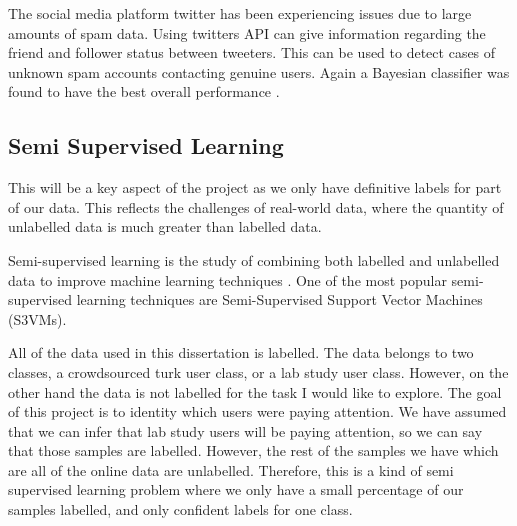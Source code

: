 \documentclass{article}
\begin{document}
The social media platform twitter has been experiencing issues due to large amounts of spam data.
Using twitters API can give information regarding the friend and follower status between tweeters.
This can be used to detect cases of unknown spam accounts contacting genuine users.
Again a Bayesian classifier was found to have the best overall performance \cite{wang2010don}.   




\subsection{Semi Supervised Learning}
This will be a key aspect of the project as we only have definitive labels for part of our data.
This reflects the challenges of real-world data, where the quantity of unlabelled data is much greater than labelled data.

Semi-supervised learning is the study of combining both labelled and unlabelled data to improve machine learning techniques \cite{zhu2009introduction}.
One of the most popular semi-supervised learning techniques are Semi-Supervised Support Vector Machines (S3VMs).




All of the data used in this dissertation is labelled.
The data belongs to two classes, a crowdsourced turk user class, or a lab study user class.
However, on the other hand the data is not labelled for the task I would like to explore.
The goal of this project is to identity which users were paying attention.
We have assumed that we can infer that lab study users will be paying attention, so we can say that those samples are labelled.
However, the rest of the samples we have which are all of the online data are unlabelled.
Therefore, this is a kind of semi supervised learning problem where we only have a small percentage of our samples labelled, and only confident labels for one class.
\end{document}
